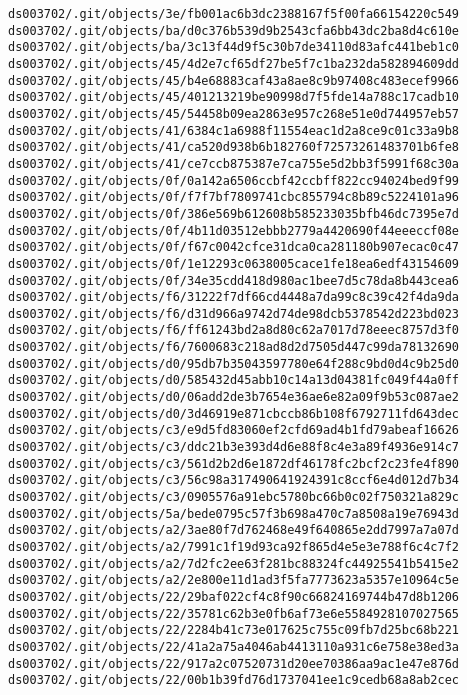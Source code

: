 \documentclass[11pt]{article}
\begin{document}
\begin{Verbatim}[commandchars=\\\{\}]
ds003702/.git/objects/3e/fb001ac6b3dc2388167f5f00fa66154220c549
ds003702/.git/objects/ba/d0c376b539d9b2543cfa6bb43dc2ba8d4c610e
ds003702/.git/objects/ba/3c13f44d9f5c30b7de34110d83afc441beb1c0
ds003702/.git/objects/45/4d2e7cf65df27be5f7c1ba232da582894609dd
ds003702/.git/objects/45/b4e68883caf43a8ae8c9b97408c483ecef9966
ds003702/.git/objects/45/401213219be90998d7f5fde14a788c17cadb10
ds003702/.git/objects/45/54458b09ea2863e957c268e51e0d744957eb57
ds003702/.git/objects/41/6384c1a6988f11554eac1d2a8ce9c01c33a9b8
ds003702/.git/objects/41/ca520d938b6b182760f72573261483701b6fe8
ds003702/.git/objects/41/ce7ccb875387e7ca755e5d2bb3f5991f68c30a
ds003702/.git/objects/0f/0a142a6506ccbf42ccbff822cc94024bed9f99
ds003702/.git/objects/0f/f7f7bf7809741cbc855794c8b89c5224101a96
ds003702/.git/objects/0f/386e569b612608b585233035bfb46dc7395e7d
ds003702/.git/objects/0f/4b11d03512ebbb2779a4420690f44eeeccf08e
ds003702/.git/objects/0f/f67c0042cfce31dca0ca281180b907ecac0c47
ds003702/.git/objects/0f/1e12293c0638005cace1fe18ea6edf43154609
ds003702/.git/objects/0f/34e35cdd418d980ac1bee7d5c78da8b443cea6
ds003702/.git/objects/f6/31222f7df66cd4448a7da99c8c39c42f4da9da
ds003702/.git/objects/f6/d31d966a9742d74de98dcb5378542d223bd023
ds003702/.git/objects/f6/ff61243bd2a8d80c62a7017d78eeec8757d3f0
ds003702/.git/objects/f6/7600683c218ad8d2d7505d447c99da78132690
ds003702/.git/objects/d0/95db7b35043597780e64f288c9bd0d4c9b25d0
ds003702/.git/objects/d0/585432d45abb10c14a13d04381fc049f44a0ff
ds003702/.git/objects/d0/06add2de3b7654e36ae6e82a09f9b53c087ae2
ds003702/.git/objects/d0/3d46919e871cbccb86b108f6792711fd643dec
ds003702/.git/objects/c3/e9d5fd83060ef2cfd69ad4b1fd79abeaf16626
ds003702/.git/objects/c3/ddc21b3e393d4d6e88f8c4e3a89f4936e914c7
ds003702/.git/objects/c3/561d2b2d6e1872df46178fc2bcf2c23fe4f890
ds003702/.git/objects/c3/56c98a317490641924391c8ccf6e4d012d7b34
ds003702/.git/objects/c3/0905576a91ebc5780bc66b0c02f750321a829c
ds003702/.git/objects/5a/bede0795c57f3b698a470c7a8508a19e76943d
ds003702/.git/objects/a2/3ae80f7d762468e49f640865e2dd7997a7a07d
ds003702/.git/objects/a2/7991c1f19d93ca92f865d4e5e3e788f6c4c7f2
ds003702/.git/objects/a2/7d2fc2ee63f281bc88324fc44925541b5415e2
ds003702/.git/objects/a2/2e800e11d1ad3f5fa7773623a5357e10964c5e
ds003702/.git/objects/22/29baf022cf4c8f90c66824169744b47d8b1206
ds003702/.git/objects/22/35781c62b3e0fb6af73e6e5584928107027565
ds003702/.git/objects/22/2284b41c73e017625c755c09fb7d25bc68b221
ds003702/.git/objects/22/41a2a75a4046ab4413110a931c6e758e38ed3a
ds003702/.git/objects/22/917a2c07520731d20ee70386aa9ac1e47e876d
ds003702/.git/objects/22/00b1b39fd76d1737041ee1c9cedb68a8ab2cec

\end{Verbatim}
\end{document}
